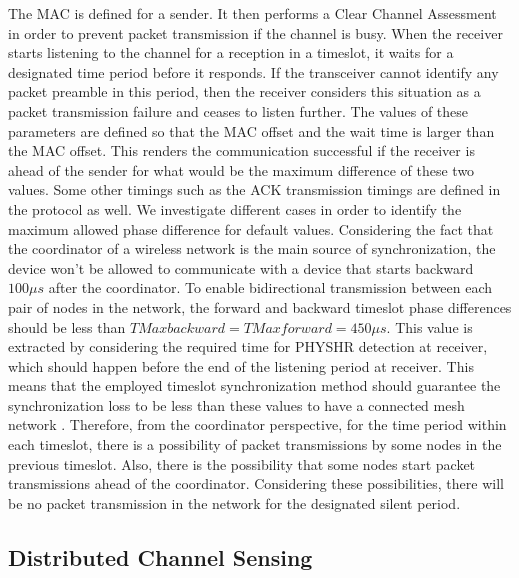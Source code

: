 \documentclass[acmsmall, authorversion]{acmart}
\begin{document}
The MAC is defined for a sender. It then performs a Clear Channel Assessment in order to prevent packet transmission if the channel is busy. When the receiver starts listening to the channel for a reception in a timeslot, it waits for a designated time period before it responds. If the transceiver cannot identify any packet preamble in this period, then the receiver considers this situation as a packet transmission failure and ceases to listen further. The values of these parameters are defined so that the MAC offset and the wait time is larger than the MAC offset. This renders the communication successful if the receiver is ahead of the sender for what would be the maximum difference of these two values. Some other timings such as the ACK transmission timings are defined in the protocol as well. We investigate different cases in order to identify the maximum allowed phase difference for default values. Considering the fact that the coordinator of a wireless network is the main source of synchronization, the device won't be allowed to communicate with a device that starts backward $100μs$ after the coordinator. To enable bidirectional transmission between each pair of nodes in the network, the forward and backward timeslot phase differences should be less than $TMaxbackward=TMaxforward=450μs$. This value is extracted by considering the required time for PHYSHR detection at receiver, which should happen before the end of the listening period at receiver. This means that the employed timeslot synchronization method should guarantee the synchronization loss to be less than these values to have a connected mesh network \cite{els}. Therefore, from the coordinator perspective, for the time period within each timeslot, there is a possibility of packet transmissions by some nodes in the previous timeslot. Also, there is the possibility that some nodes start packet transmissions ahead of the coordinator. Considering these possibilities, there will be no packet transmission in the network for the designated silent period.

\subsection{Distributed Channel Sensing}
\end{document}
